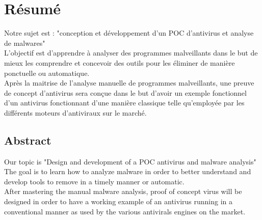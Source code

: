 \newpage
\chapter*{Résumé}
Notre sujet est : "conception et développement d'un POC  d'antivirus et analyse de malwares"\\

L'objectif est d'apprendre à analyser des programmes malveillants  dans le but de mieux les comprendre et concevoir des outils pour les éliminer de manière ponctuelle ou automatique.\\

Après la maitrise de l'analyse manuelle de programmes malveillants, une preuve de concept d'antivirus sera conçue dans le but d'avoir un exemple fonctionnel d'un antivirus fonctionnant d'une manière classique telle qu'employée par les différents moteurs d'antiviraux sur le marché. 

\section*{Abstract} 

Our topic is "Design and development of a POC antivirus and malware analysis"\\

The goal is to learn how to analyze malware in order to better understand and develop tools to remove in a timely manner or automatic.\\

After mastering the manual malware analysis, proof of concept virus will be designed in order to have a working example of an antivirus running in a conventional manner as used by the various antivirals engines  on the market.